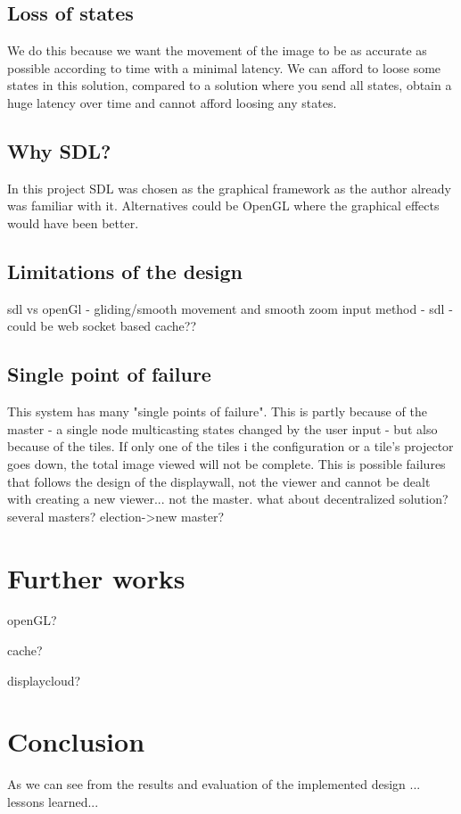 \documentclass[12pt, a4paper, oneside]{article}
\begin{document}
\subsection{Loss of states}
We do this because we want the movement of the image to be as accurate as possible according to time with a minimal latency. 
We can afford to loose some states in this solution, compared to a solution where you send all states, obtain a huge latency over time and cannot afford loosing any states.

\subsection{Why SDL?}
In this project SDL was chosen as the graphical framework as the author already was familiar with it. Alternatives could be OpenGL where the graphical effects would have been better. 

\subsection{Limitations of the design}
sdl vs openGl - gliding/smooth movement and smooth zoom
input method - sdl - could be web socket based
cache??

\subsection{Single point of failure}
This system has many "single points of failure". This is partly because of the master - a single node multicasting states changed by the user input - but also because of the tiles. If only one of the tiles i the configuration or a tile's projector goes down, the total image viewed will not be complete. This is possible failures that follows the design of the displaywall, not the viewer and cannot be dealt with creating a new viewer...
not the master. what about decentralized solution? several masters? election->new master?
\newpage
\section{Further works}
openGL?

cache?

displaycloud?

\newpage
\section{Conclusion}
As we can see from the results and evaluation of the implemented design ...
lessons learned...

\newpage




\end{document}
